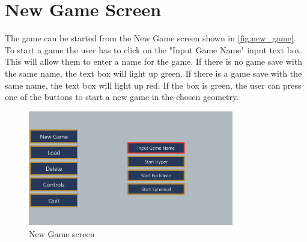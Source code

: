 \section{New Game Screen}
The game can be started from the New Game screen shown in \autoref{fig:new_game}.
To start a game the user has to click on the "Input Game Name" input text box.
This will allow them to enter a name for the game.
If there is no game save with the same name, the text box will light up green.
If there is a game save with the same name, the text box will light up red.
If the box is green, the user can press one of the buttons to start a new game in the chosen geometry.

\begin{figure}[h]
    \centering
    \includegraphics[width=0.8\textwidth]{chapters/user_manual/resources/new-game-no-input.png}
    \caption{New Game screen}
    \label{fig:new_game}
\end{figure}